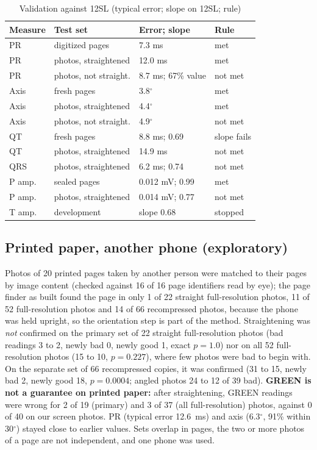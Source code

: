 \documentclass[conference]{IEEEtran}
\begin{document}
\begin{table}[t]
\caption{Validation against 12SL (typical error; slope on 12SL; rule)}
\label{tab:valid}
\centering
\small
\begin{tabular}{llll}
\toprule
Measure & Test set & Error; slope & Rule \\
\midrule
PR & digitized pages & 7.3 ms & met \\
PR & photos, straightened & 12.0 ms & met \\
PR & photos, not straight. & 8.7 ms; 67\% value & not met \\
Axis & fresh pages & 3.8$^\circ$ & met \\
Axis & photos, straightened & 4.4$^\circ$ & met \\
Axis & photos, not straight. & 4.9$^\circ$ & not met \\
QT & fresh pages & 8.8 ms; 0.69 & slope fails \\
QT & photos, straightened & 14.9 ms & not met \\
QRS & photos, straightened & 6.2 ms; 0.74 & not met \\
P amp. & sealed pages & 0.012 mV; 0.99 & met \\
P amp. & photos, straightened & 0.014 mV; 0.77 & not met \\
T amp. & development & slope 0.68 & stopped \\
\bottomrule
\end{tabular}
\end{table}

\subsection{Printed paper, another phone (exploratory)}
Photos of 20 printed pages taken by another person were matched to their pages by image content (checked against 16 of 16 page identifiers read by eye); the page finder as built found the page in only 1 of 22 straight full-resolution photos, 11 of 52 full-resolution photos and 14 of 66 recompressed photos, because the phone was held upright, so the orientation step is part of the method. Straightening was \emph{not} confirmed on the primary set of 22 straight full-resolution photos (bad readings 3 to 2, newly bad 0, newly good 1, exact $p=1.0$) nor on all 52 full-resolution photos (15 to 10, $p=0.227$), where few photos were bad to begin with. On the separate set of 66 recompressed copies, it was confirmed (31 to 15, newly bad 2, newly good 18, $p=0.0004$; angled photos 24 to 12 of 39 bad). \textbf{GREEN is not a guarantee on printed paper:} after straightening, GREEN readings were wrong for 2 of 19 (primary) and 3 of 37 (all full-resolution) photos, against 0 of 40 on our screen photos. PR (typical error 12.6~ms) and axis (6.3$^\circ$, 91\% within 30$^\circ$) stayed close to earlier values. Sets overlap in pages, the two or more photos of a page are not independent, and one phone was used.
\end{document}
